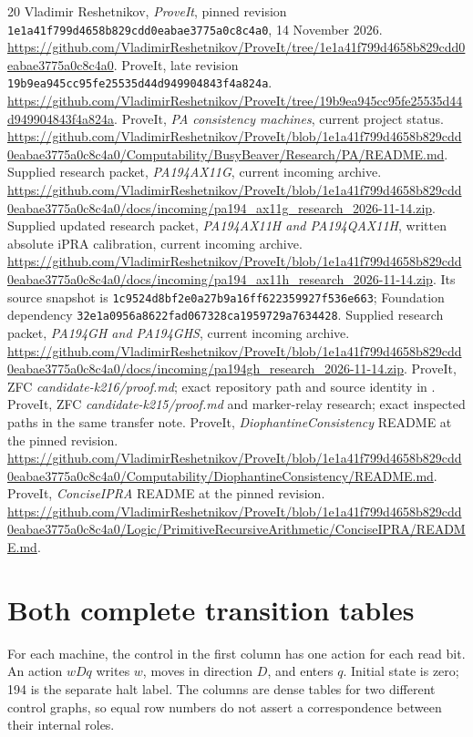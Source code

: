 \documentclass[10pt,letterpaper]{article}
\newcommand{\file}[1]{\texttt{\path{#1}}}
\begin{document}
\begin{thebibliography}{20}\small
{} Vladimir Reshetnikov, \emph{ProveIt}, pinned revision
\nolinkurl{1e1a41f799d4658b829cdd0eabae3775a0c8c4a0}, 14 November 2026.
\url{https://github.com/VladimirReshetnikov/ProveIt/tree/1e1a41f799d4658b829cdd0eabae3775a0c8c4a0}.
 ProveIt, late revision
\nolinkurl{19b9ea945cc95fe25535d44d949904843f4a824a}.
\url{https://github.com/VladimirReshetnikov/ProveIt/tree/19b9ea945cc95fe25535d44d949904843f4a824a}.
 ProveIt, \emph{PA consistency machines}, current project status.
\url{https://github.com/VladimirReshetnikov/ProveIt/blob/1e1a41f799d4658b829cdd0eabae3775a0c8c4a0/Computability/BusyBeaver/Research/PA/README.md}.
 Supplied research packet, \emph{PA194AX11G}, current incoming archive.
\url{https://github.com/VladimirReshetnikov/ProveIt/blob/1e1a41f799d4658b829cdd0eabae3775a0c8c4a0/docs/incoming/pa194_ax11g_research_2026-11-14.zip}.
 Supplied updated research packet, \emph{PA194AX11H and PA194QAX11H},
written absolute iPRA calibration, current incoming archive.
\url{https://github.com/VladimirReshetnikov/ProveIt/blob/1e1a41f799d4658b829cdd0eabae3775a0c8c4a0/docs/incoming/pa194_ax11h_research_2026-11-14.zip}.
Its source snapshot is \nolinkurl{1c9524d8bf2e0a27b9a16ff622359927f536e663};
Foundation dependency \nolinkurl{32e1a0956a8622fad067328ca1959729a7634428}.
 Supplied research packet, \emph{PA194GH and PA194GHS}, current incoming archive.
\url{https://github.com/VladimirReshetnikov/ProveIt/blob/1e1a41f799d4658b829cdd0eabae3775a0c8c4a0/docs/incoming/pa194gh_research_2026-11-14.zip}.
 ProveIt, ZFC \emph{candidate-k216/proof.md}; exact repository
path and source identity in \file{research/physical/ZFC_TRANSFER.md}.
 ProveIt, ZFC \emph{candidate-k215/proof.md} and marker-relay
research; exact inspected paths in the same transfer note.
 ProveIt, \emph{DiophantineConsistency} README at the pinned revision.
\url{https://github.com/VladimirReshetnikov/ProveIt/blob/1e1a41f799d4658b829cdd0eabae3775a0c8c4a0/Computability/DiophantineConsistency/README.md}.
 ProveIt, \emph{ConciseIPRA} README at the pinned revision.
\url{https://github.com/VladimirReshetnikov/ProveIt/blob/1e1a41f799d4658b829cdd0eabae3775a0c8c4a0/Logic/PrimitiveRecursiveArithmetic/ConciseIPRA/README.md}.
\end{thebibliography}

\appendix\clearpage
\section{Both complete transition tables}\label{app:tables}
For each machine, the control in the first column has one action for each
read bit. An action $wDq$ writes $w$, moves in direction $D$, and enters
$q$. Initial state is zero; 194 is the separate halt label. The columns
are dense tables for two different control graphs, so equal row numbers
do not assert a correspondence between their internal roles.

\end{document}
